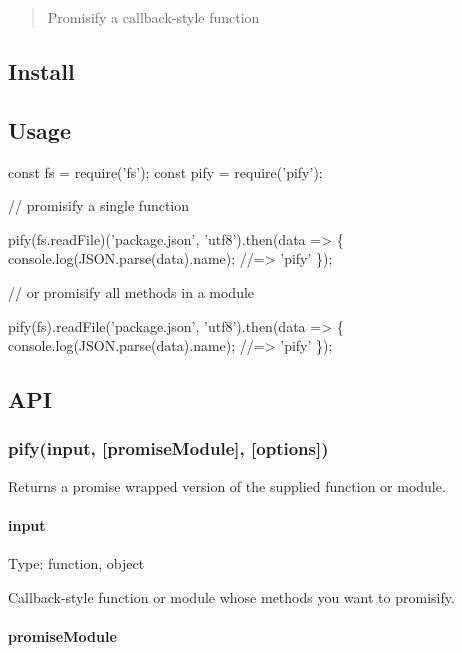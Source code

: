 \begin{quote}
Promisify a callback-\/style function \end{quote}


\subsection*{Install}




\subsection*{Usage}


\begin{DoxyCode}
const fs = require('fs');
const pify = require('pify');

// promisify a single function

pify(fs.readFile)('package.json', 'utf8').then(data => \{
    console.log(JSON.parse(data).name);
    //=> 'pify'
\});

// or promisify all methods in a module

pify(fs).readFile('package.json', 'utf8').then(data => \{
    console.log(JSON.parse(data).name);
    //=> 'pify'
\});
\end{DoxyCode}


\subsection*{A\+PI}

\subsubsection*{pify(input, \mbox{[}promise\+Module\mbox{]}, \mbox{[}options\mbox{]})}

Returns a promise wrapped version of the supplied function or module.

\paragraph*{input}

Type\+: {\ttfamily function}, {\ttfamily object}

Callback-\/style function or module whose methods you want to promisify.

\paragraph*{promise\+Module}


